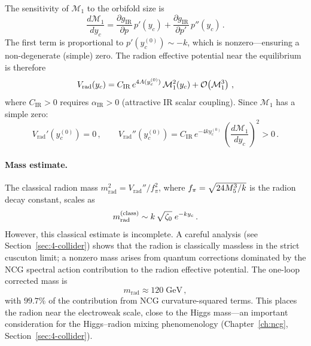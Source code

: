 The sensitivity of $\mathcal{M}_1$ to the orbifold size is
\begin{equation}
\label{eq:1-sensitivity}
\frac{d\mathcal{M}_1}{dy_c} = \frac{\partial g_{\mathrm{IR}}}{\partial p}\, p'(y_c) + \frac{\partial g_{\mathrm{IR}}}{\partial p'}\, p''(y_c)\,.
\end{equation}
The first term is proportional to $p'(y_c^{(0)}) \sim -k$, which is nonzero---ensuring a non-degenerate (simple) zero. The radion effective potential near the equilibrium is therefore
\begin{equation}
\label{eq:1-vrad}
V_{\mathrm{rad}}(y_c) = C_{\mathrm{IR}}\, e^{4A(y_c^{(0)})}\, \mathcal{M}_1^2(y_c) + \mathcal{O}\!\left(\mathcal{M}_1^3\right)\,,
\end{equation}
where $C_{\mathrm{IR}} > 0$ requires $\alpha_{\mathrm{IR}} > 0$ (attractive IR scalar coupling). Since $\mathcal{M}_1$ has a simple zero:
\begin{equation}
\label{eq:1-vrad-stable}
V_{\mathrm{rad}}'(y_c^{(0)}) = 0\,, \qquad V_{\mathrm{rad}}''(y_c^{(0)}) = C_{\mathrm{IR}}\, e^{-4ky_c^{(0)}}\, \left(\frac{d\mathcal{M}_1}{dy_c}\right)^{\!2} > 0\,.
\end{equation}

\paragraph{Mass estimate.} The classical radion mass $m_{\mathrm{rad}}^2 = V_{\mathrm{rad}}'' / f_\pi^2$, where $f_\pi = \sqrt{24M_5^3/k}$ is the radion decay constant, scales as
\begin{equation}
\label{eq:1-radion-mass-classical}
m_{\mathrm{rad}}^{(\mathrm{class})} \sim k\,\sqrt{\zeta_0}\; e^{-ky_c}\,.
\end{equation}
However, this classical estimate is incomplete. A careful analysis (see Section~\ref{sec:4-collider}) shows that the radion is classically massless in the strict cuscuton limit; a nonzero mass arises from quantum corrections dominated by the NCG spectral action contribution to the radion effective potential. The one-loop corrected mass is
\begin{equation}
\label{eq:1-radion-mass-quantum}
m_{\mathrm{rad}} \approx 120\;\mathrm{GeV}\,,
\end{equation}
with $99.7\%$ of the contribution from NCG curvature-squared terms. This places the radion near the electroweak scale, close to the Higgs mass---an important consideration for the Higgs--radion mixing phenomenology (Chapter~\ref{ch:ncg}, Section~\ref{sec:4-collider}).


